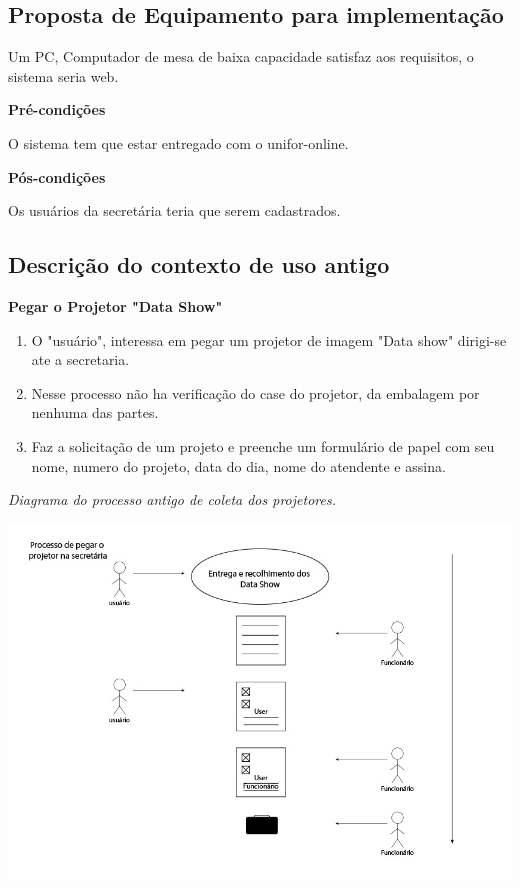 \subsection{Proposta de Equipamento para implementação}


Um PC, Computador de mesa de baixa capacidade satisfaz aos requisitos, o sistema
seria web. 


\textbf{Pré-condições}


O sistema tem que estar entregado com o unifor-online. 


\textbf{Pós-condições}

Os usuários da secretária teria que serem cadastrados. 


\newpage
\subsection{Descrição do contexto de uso antigo}


\textbf{Pegar o Projetor "Data Show"}


\begin{enumerate}
  
  \item O "usuário", interessa em pegar um projetor de imagem "Data show" dirigi-se ate a
  secretaria. 

  \item Nesse processo não ha verificação do case do projetor, da embalagem por
    nenhuma das partes. 

  \item Faz a solicitação de um projeto e preenche um formulário de papel com
    seu nome, numero do projeto, data do dia, nome do atendente e assina. 

\end{enumerate}

\textit{Diagrama do processo antigo de coleta dos projetores.}

  \begin{center}
    \includegraphics[scale=0.5]{imagens/fluxo1.jpg}\\
  \end{center}

